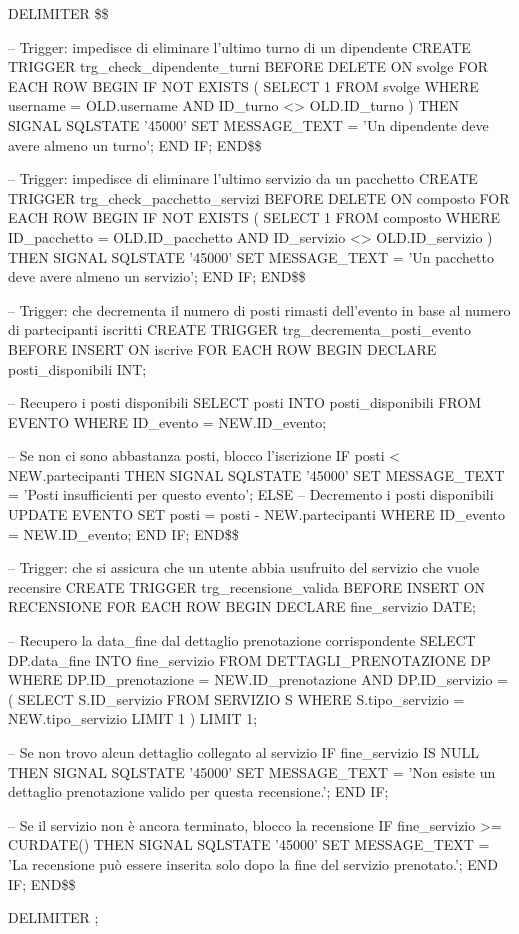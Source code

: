\documentclass[a4paper,12pt]{report}
\begin{document}
\begin{sqlcode}[caption={TRIGGERS},label={lst:trigger}]

DELIMITER \$\$

-- Trigger: impedisce di eliminare l'ultimo turno di un dipendente
CREATE TRIGGER trg_check_dipendente_turni
BEFORE DELETE ON svolge
FOR EACH ROW
BEGIN
    IF NOT EXISTS (
       SELECT 1 FROM svolge
        WHERE username = OLD.username
        AND ID_turno <> OLD.ID_turno
    ) THEN
        SIGNAL SQLSTATE '45000'
        SET MESSAGE_TEXT = 'Un dipendente deve avere almeno un turno';
    END IF;
END\$\$

-- Trigger: impedisce di eliminare l’ultimo servizio da un pacchetto
CREATE TRIGGER trg_check_pacchetto_servizi
BEFORE DELETE ON composto
FOR EACH ROW
BEGIN
    IF NOT EXISTS (
        SELECT 1 FROM composto
        WHERE ID_pacchetto = OLD.ID_pacchetto
        AND ID_servizio <> OLD.ID_servizio
    ) THEN
        SIGNAL SQLSTATE '45000'
        SET MESSAGE\_TEXT = 'Un pacchetto deve avere almeno un servizio';
    END IF;
END\$\$

-- Trigger: che decrementa il numero di posti rimasti dell'evento in base al numero di partecipanti iscritti
CREATE TRIGGER trg_decrementa_posti_evento
BEFORE INSERT ON iscrive
FOR EACH ROW
BEGIN
    DECLARE posti_disponibili INT;
    
    -- Recupero i posti disponibili
    SELECT posti
    INTO posti_disponibili
    FROM EVENTO
    WHERE ID_evento = NEW.ID_evento;
    
    -- Se non ci sono abbastanza posti, blocco l'iscrizione
    IF posti < NEW.partecipanti THEN
        SIGNAL SQLSTATE '45000'
            SET MESSAGE_TEXT = 'Posti insufficienti per questo evento';
    ELSE
        -- Decremento i posti disponibili
        UPDATE EVENTO
        SET posti = posti - NEW.partecipanti
        WHERE ID_evento = NEW.ID_evento;
    END IF;
END\$\$

-- Trigger: che si assicura che un utente abbia usufruito del servizio che vuole recensire
CREATE TRIGGER trg_recensione_valida
BEFORE INSERT ON RECENSIONE
FOR EACH ROW
BEGIN
    DECLARE fine_servizio DATE;
    
    -- Recupero la data_fine dal dettaglio prenotazione corrispondente
    SELECT DP.data_fine
    INTO fine_servizio
    FROM DETTAGLI_PRENOTAZIONE DP
    WHERE DP.ID_prenotazione = NEW.ID_prenotazione
      AND DP.ID_servizio = (
          SELECT S.ID_servizio
          FROM SERVIZIO S
          WHERE S.tipo_servizio = NEW.tipo_servizio
          LIMIT 1
      )
    LIMIT 1;
    
    -- Se non trovo alcun dettaglio collegato al servizio
    IF fine_servizio IS NULL THEN
        SIGNAL SQLSTATE '45000'
            SET MESSAGE_TEXT = 'Non esiste un dettaglio prenotazione valido per questa recensione.';
    END IF;
    
    -- Se il servizio non è ancora terminato, blocco la recensione
    IF fine_servizio >= CURDATE() THEN
        SIGNAL SQLSTATE '45000'
            SET MESSAGE_TEXT = 'La recensione può essere inserita solo dopo la fine del servizio prenotato.';
    END IF;
END\$\$

DELIMITER ;
\end{sqlcode}
\end{document}
